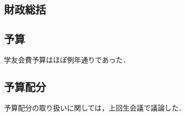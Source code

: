 \subsection*{財政総括}


\subsection*{予算}
学友会費予算はほぼ例年通りであった．

\subsection*{予算配分}
予算配分の取り扱いに関しては，上回生会議で議論した．

